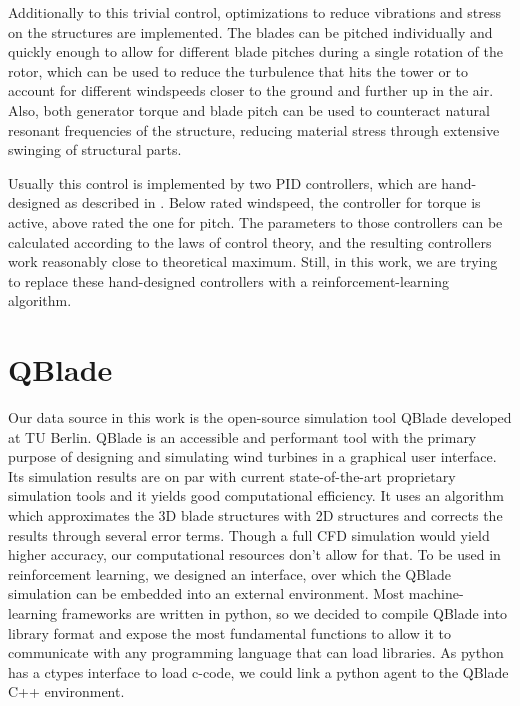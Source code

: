 \documentclass[hyperref,german,beleg]{cgvpub}
\begin{document}
Additionally to this trivial control, optimizations to reduce vibrations and stress on the structures are implemented. The blades can be pitched individually and quickly enough to allow for different blade pitches during a single rotation of the rotor, which can be used to reduce the turbulence that hits the tower or to account for different windspeeds closer to the ground and further up in the air. Also, both generator torque and blade pitch can be used to counteract natural resonant frequencies of the structure, reducing material stress through extensive swinging of structural parts.

Usually this control is implemented by two PID controllers, which are hand-designed as described in \cite[sec 8.4]{Burton_Jenkins_Sharpe_Bossanyi_2011}. Below rated windspeed, the controller for torque is active, above rated the one for pitch. The parameters to those controllers can be calculated according to the laws of control theory, and the resulting controllers work reasonably close to theoretical maximum. Still, in this work, we are trying to replace these hand-designed controllers with a reinforcement-learning algorithm.


\section{QBlade}
Our data source in this work is the open-source simulation tool QBlade \cite{Marten_Wendler_Pechlivanoglou_Nayeri_Paschereit_2013} developed at TU Berlin. QBlade is an accessible and performant tool with the primary purpose of designing and simulating wind turbines in a graphical user interface. Its simulation results are on par with current state-of-the-art proprietary simulation tools and it yields good computational efficiency. It uses an algorithm which approximates the 3D blade structures with 2D structures and corrects the results through several error terms. Though a full CFD simulation would yield higher accuracy, our computational resources don't allow for that. To be used in reinforcement learning, we designed an interface, over which the QBlade simulation can be embedded into an external environment. Most machine-learning frameworks are written in python, so we decided to compile QBlade into library format and expose the most fundamental functions to allow it to communicate with any programming language that can load libraries. As python has a ctypes interface to load c-code, we could link a python agent to the QBlade C++ environment.
\end{document}
